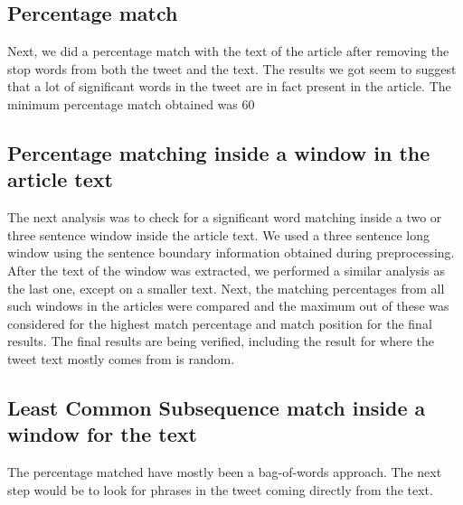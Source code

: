 \subsection{Percentage match}

Next, we did a percentage match with the text of the article after removing the stop words from both the tweet and the text. The results we got seem to suggest that a lot of significant words in the tweet are in fact present in the article. The minimum percentage match obtained was 60%

\subsection{Percentage matching inside a window in the article text}

The next analysis was to check for a significant word matching inside a two or three sentence window inside the article text. We used a three sentence long window using the sentence boundary information obtained during preprocessing. After the text of the window was extracted, we performed a similar analysis as the last one, except on a smaller text. Next, the matching percentages from all such windows in the articles were compared and the maximum out of these was considered for the highest match percentage and match position for the final results. The final results are being verified, including the result for where the tweet text mostly comes from is random.

\subsection{Least Common Subsequence match inside a window for the text}

The percentage matched have mostly been a bag-of-words approach. The next step would be to look for phrases in the tweet coming directly from the text.
